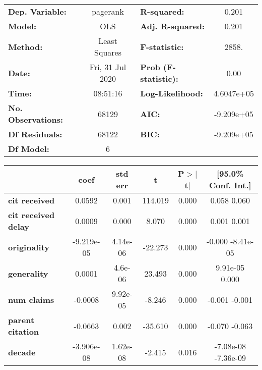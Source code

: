 \begin{center}
\begin{tabular}{lclc}
\toprule
\textbf{Dep. Variable:}     &     pagerank     & \textbf{  R-squared:         } &      0.201    \\
\textbf{Model:}             &       OLS        & \textbf{  Adj. R-squared:    } &      0.201    \\
\textbf{Method:}            &  Least Squares   & \textbf{  F-statistic:       } &      2858.    \\
\textbf{Date:}              & Fri, 31 Jul 2020 & \textbf{  Prob (F-statistic):} &      0.00     \\
\textbf{Time:}              &     08:51:16     & \textbf{  Log-Likelihood:    } &  4.6047e+05   \\
\textbf{No. Observations:}  &       68129      & \textbf{  AIC:               } &  -9.209e+05   \\
\textbf{Df Residuals:}      &       68122      & \textbf{  BIC:               } &  -9.209e+05   \\
\textbf{Df Model:}          &           6      & \textbf{                     } &               \\
\bottomrule
\end{tabular}
\begin{tabular}{lccccc}
                            & \textbf{coef} & \textbf{std err} & \textbf{t} & \textbf{P$>$$|$t$|$} & \textbf{[95.0\% Conf. Int.]}  \\
\midrule
\textbf{cit received}       &       0.0592  &        0.001     &   114.019  &         0.000        &         0.058     0.060       \\
\textbf{cit received delay} &       0.0009  &        0.000     &     8.070  &         0.000        &         0.001     0.001       \\
\textbf{originality}        &   -9.219e-05  &     4.14e-06     &   -22.273  &         0.000        &        -0.000 -8.41e-05       \\
\textbf{generality}         &       0.0001  &      4.6e-06     &    23.493  &         0.000        &      9.91e-05     0.000       \\
\textbf{num claims}         &      -0.0008  &     9.92e-05     &    -8.246  &         0.000        &        -0.001    -0.001       \\
\textbf{parent citation}    &      -0.0663  &        0.002     &   -35.610  &         0.000        &        -0.070    -0.063       \\
\textbf{decade}             &   -3.906e-08  &     1.62e-08     &    -2.415  &         0.016        &     -7.08e-08 -7.36e-09       \\

\end{tabular}
\end{center}
